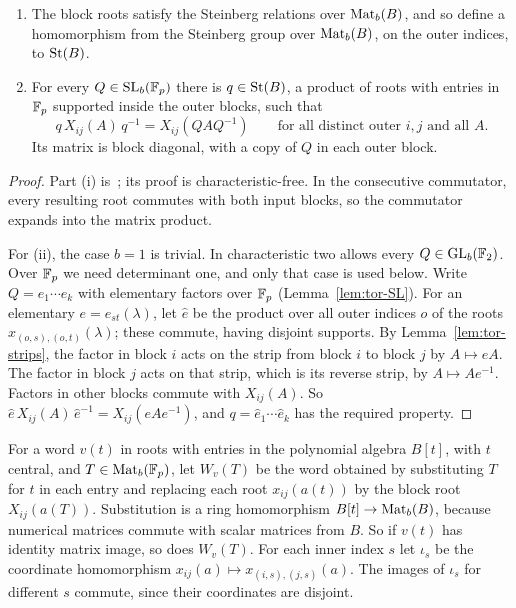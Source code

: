 \begin{lemma}\label{lem:tor-block}
\begin{enumerate}[label=\textup{(\roman*)}]
\item The block roots satisfy the Steinberg relations over $\operatorname{Mat}_b(B)$, and so define a homomorphism from the
Steinberg group over $\operatorname{Mat}_b(B)$, on the outer indices, to $\operatorname{St}(B)$.
\item For every $Q\in\operatorname{SL}_b(\mathbb F_p)$ there is $q\in\operatorname{St}(B)$, a product of roots with entries in $\mathbb F_p$ supported inside the
outer blocks, such that
\[
 q\,X_{ij}(A)\,q^{-1}=X_{ij}(QAQ^{-1})\qquad\text{for all distinct outer }i,j\text{ and all }A.
\]
Its matrix is block diagonal, with a copy of $Q$ in each outer block.
\end{enumerate}
\end{lemma}

\begin{proof}
Part (i) is~\cite[Lemma~4.1]{OAI247rf}; its proof is characteristic-free. In the consecutive commutator, every resulting
root commutes with both input blocks, so the commutator expands into the matrix product.

For (ii), the case $b=1$ is trivial. In characteristic two \cite{OAI247rf} allows every $Q\in\operatorname{GL}_b(\mathbb F_2)$. Over $\mathbb F_p$
we need determinant one, and only that case is used below. Write $Q=e_1\cdots e_k$ with elementary factors over $\mathbb F_p$
(Lemma~\ref{lem:tor-SL}). For an elementary $e=e_{st}(\lambda)$, let $\hat e$ be the product over all outer indices $o$
of the roots $x_{(o,s),(o,t)}(\lambda)$; these commute, having disjoint supports. By Lemma~\ref{lem:tor-strips}, the
factor in block $i$ acts on the strip from block $i$ to block $j$ by $A\mapsto eA$. The factor in block $j$ acts on that
strip, which is its reverse strip, by $A\mapsto Ae^{-1}$. Factors in other blocks commute with $X_{ij}(A)$. So
$\hat e\,X_{ij}(A)\,\hat e^{-1}=X_{ij}(eAe^{-1})$, and $q=\hat e_1\cdots\hat e_k$ has the required property.
\end{proof}

For a word $v(t)$ in roots with entries in the polynomial algebra $B[t]$, with $t$ central, and $T\in\operatorname{Mat}_b(\mathbb F_p)$, let
$W_v(T)$ be the word obtained by substituting $T$ for $t$ in each entry and replacing each root $x_{ij}(a(t))$ by the
block root $X_{ij}(a(T))$. Substitution is a ring homomorphism $B[t]\to\operatorname{Mat}_b(B)$, because numerical matrices commute
with scalar matrices from $B$. So if $v(t)$ has identity matrix image, so does $W_v(T)$. For each inner index $s$ let
$\iota_s$ be the coordinate homomorphism $x_{ij}(a)\mapsto x_{(i,s),(j,s)}(a)$. The images of $\iota_s$ for different $s$
commute, since their coordinates are disjoint.


